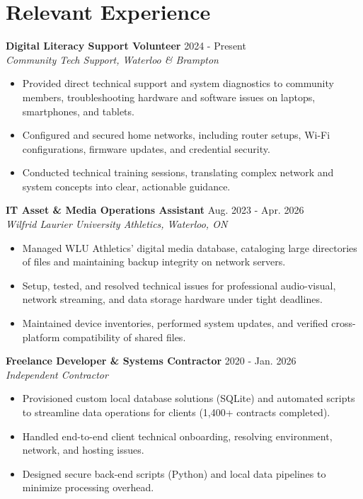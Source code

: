 \documentclass[a4paper,10pt]{article}
\begin{document}
\section*{Relevant Experience}
\textbf{Digital Literacy Support Volunteer} \hfill 2024 - Present \\
\textit{Community Tech Support, Waterloo & Brampton}
\begin{itemize}
    \item Provided direct technical support and system diagnostics to community members, troubleshooting hardware and software issues on laptops, smartphones, and tablets.
    \item Configured and secured home networks, including router setups, Wi-Fi configurations, firmware updates, and credential security.
    \item Conducted technical training sessions, translating complex network and system concepts into clear, actionable guidance.
\end{itemize}

\vspace{3pt}
\textbf{IT Asset & Media Operations Assistant} \hfill Aug. 2023 - Apr. 2026 \\
\textit{Wilfrid Laurier University Athletics, Waterloo, ON}
\begin{itemize}
    \item Managed WLU Athletics' digital media database, cataloging large directories of files and maintaining backup integrity on network servers.
    \item Setup, tested, and resolved technical issues for professional audio-visual, network streaming, and data storage hardware under tight deadlines.
    \item Maintained device inventories, performed system updates, and verified cross-platform compatibility of shared files.
\end{itemize}

\vspace{3pt}
\textbf{Freelance Developer & Systems Contractor} \hfill 2020 - Jan. 2026 \\
\textit{Independent Contractor}
\begin{itemize}
    \item Provisioned custom local database solutions (SQLite) and automated scripts to streamline data operations for clients (1,400+ contracts completed).
    \item Handled end-to-end client technical onboarding, resolving environment, network, and hosting issues.
    \item Designed secure back-end scripts (Python) and local data pipelines to minimize processing overhead.
\end{itemize}
\end{document}
